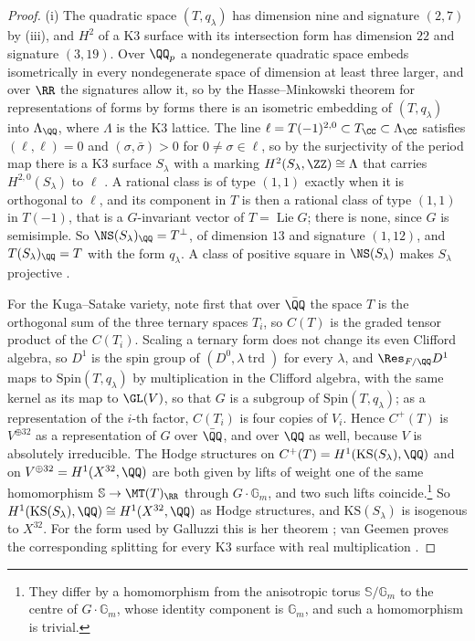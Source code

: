 \begin{proof}
(i) The quadratic space $(T,q_{\lambda})$ has dimension nine and signature
$(2,7)$ by (iii), and $H^{2}$ of a K3 surface with its
intersection form has dimension $22$ and signature $(3,19)$. Over $\QQ_{p}$
a nondegenerate quadratic space embeds isometrically in every nondegenerate
space of dimension at least three larger, and over $\RR$ the signatures
allow it, so by the Hasse--Minkowski theorem for representations of forms by
forms \cite[\S\S63, 66]{OMe00} there is an isometric embedding of
$(T,q_{\lambda})$ into $\Lambda_{\QQ}$, where $\Lambda$ is the K3 lattice.
The line $\ell=T(-1)^{2,0}\subset T_{\CC}\subset\Lambda_{\CC}$ satisfies
$(\ell,\ell)=0$ and $(\sigma,\bar{\sigma})>0$ for $0\ne\sigma\in\ell$, so by the
surjectivity of the period map there is a K3 surface $S_{\lambda}$ with a
marking $H^{2}(S_{\lambda},\ZZ)\cong\Lambda$ that carries
$H^{2,0}(S_{\lambda})$ to $\ell$ \cite[Chs.~6--7]{Huy16}. A rational class
is of type $(1,1)$ exactly when it is orthogonal to $\ell$, and its component
in $T$ is then a rational class of type $(1,1)$ in $T(-1)$, that is a
$G$-invariant vector of $T=\operatorname{Lie}G$; there is none, since $G$ is
semisimple. So $\NS(S_{\lambda})_{\QQ}=T^{\perp}$, of dimension $13$ and
signature $(1,12)$, and $T(S_{\lambda})_{\QQ}=T$ with the form $q_{\lambda}$.
A class of positive square in $\NS(S_{\lambda})$ makes $S_{\lambda}$
projective \cite[Ch.~8]{Huy16}.

For the Kuga--Satake variety, note first that over $\bar{\QQ}$ the space $T$
is the orthogonal sum of the three ternary spaces $T_{i}$, so $C(T)$ is the
graded tensor product of the $C(T_{i})$. Scaling a ternary form does not
change its even Clifford algebra, so $D^{1}$ is the spin group of
$(D^{0},\lambda\operatorname{trd})$ for every $\lambda$, and
$\Res_{F/\QQ}D^{1}$ maps to $\mathrm{Spin}(T,q_{\lambda})$ by multiplication
in the Clifford algebra, with the same kernel as its map to $\GL(V)$, so that
$G$ is a subgroup of $\mathrm{Spin}(T,q_{\lambda})$; as a representation of
the $i$-th factor, $C(T_{i})$ is four copies of $V_{i}$. Hence $C^{+}(T)$ is
$V^{\oplus32}$ as a representation of $G$ over $\bar{\QQ}$, and over $\QQ$ as
well, because $V$ is absolutely irreducible. The Hodge structures on
$C^{+}(T)=H^{1}(\mathrm{KS}(S_{\lambda}),\QQ)$ and on
$V^{\oplus32}=H^{1}(X^{32},\QQ)$ are both given by lifts of weight one of the
same homomorphism $\mathbb{S}\to\MT(T)_{\RR}$ through $G\cdot\mathbb{G}_{m}$,
and two such lifts coincide.\footnote{They differ by a homomorphism from the
anisotropic torus $\mathbb{S}/\mathbb{G}_{m}$ to the centre of
$G\cdot\mathbb{G}_{m}$, whose identity component is $\mathbb{G}_{m}$, and
such a homomorphism is trivial.} So
$H^{1}(\mathrm{KS}(S_{\lambda}),\QQ)\cong H^{1}(X^{32},\QQ)$ as Hodge
structures, and $\mathrm{KS}(S_{\lambda})$ is isogenous to $X^{32}$. For the
form used by Galluzzi this is her theorem \cite{Gal00}; van Geemen proves the
corresponding splitting for every K3 surface with real multiplication
\cite{vG08}.


\end{proof}
